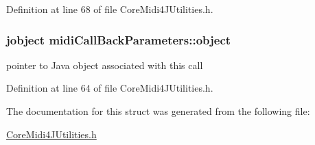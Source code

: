 Definition at line 68 of file CoreMidi4JUtilities.h.

\hypertarget{structmidi_call_back_parameters_a5c3e9c2980b21482abffba74d19bb2eb}{
\subsubsection[{object}]{\setlength{\rightskip}{0pt plus 5cm}jobject {\bf midiCallBackParameters::object}}}
\label{structmidi_call_back_parameters_a5c3e9c2980b21482abffba74d19bb2eb}
pointer to Java object associated with this call 

Definition at line 64 of file CoreMidi4JUtilities.h.



The documentation for this struct was generated from the following file:\begin{DoxyCompactItemize}
\item 
\hyperlink{_core_midi4_j_utilities_8h}{CoreMidi4JUtilities.h}\end{DoxyCompactItemize}
